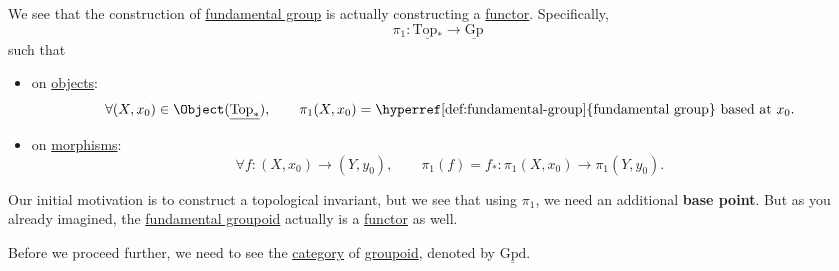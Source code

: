 \begin{remark}
	We see that the construction of \hyperref[def:fundamental-group]{fundamental group} is actually constructing a \hyperref[def:functor]{functor}. Specifically,
	\[
		\pi _1\colon \underline{\mathrm{Top}_*} \to \underline{\mathrm{Gp}}
	\]
	such that
	\begin{itemize}
		\item on \hyperref[def:object]{objects}:
		      \[
			      \forall (X, x_{0} )\in \Object (\underline{\mathrm{Top}_*}),\qquad \pi _1(X, x_0) = \text{\hyperref[def:fundamental-group]{fundamental group} based at \(x_0\)}.
		      \]
		\item on \hyperref[def:morphism]{morphisms}:
		      \[
			      \forall f\colon (X, x_0)\to (Y, y_0),\qquad \pi _1(f) = f_\ast \colon \pi _1(X, x_0)\to \pi _1(Y, y_0).
		      \]
	\end{itemize}
\end{remark}

\hr

Our initial motivation is to construct a topological invariant, but we see that using \(\pi _1\), we need an additional \textbf{base point}. But as you already
imagined, the \hyperref[def:fundamental-groupoid]{fundamental groupoid} actually is a \hyperref[def:functor]{functor} as well.

Before we proceed further, we need to see the \hyperref[def:category]{category} of \hyperref[def:groupoid]{groupoid}, denoted by \(\underline{\mathrm{Gpd}}\).

